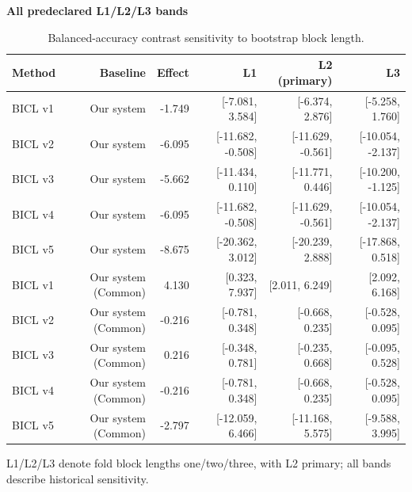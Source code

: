 \begin{table}[htb]
\centering\small
\setlength{\tabcolsep}{3pt}
\renewcommand{\arraystretch}{1.12}
\caption{Balanced-accuracy contrast sensitivity to bootstrap block length.}
\label{tab:u09-sensitivity-ba}
\textbf{All predeclared L1/L2/L3 bands}\par\smallskip
\begin{tabular}{lrrrrr}
\hline
Method & Baseline & Effect & L1 & L2 (primary) & L3 \\
\hline
BICL v1 & Our system & -1.749 & [-7.081, 3.584] & [-6.374, 2.876] & [-5.258, 1.760] \\
BICL v2 & Our system & -6.095 & [-11.682, -0.508] & [-11.629, -0.561] & [-10.054, -2.137] \\
BICL v3 & Our system & -5.662 & [-11.434, 0.110] & [-11.771, 0.446] & [-10.200, -1.125] \\
BICL v4 & Our system & -6.095 & [-11.682, -0.508] & [-11.629, -0.561] & [-10.054, -2.137] \\
BICL v5 & Our system & -8.675 & [-20.362, 3.012] & [-20.239, 2.888] & [-17.868, 0.518] \\
BICL v1 & Our system (Common) & 4.130 & [0.323, 7.937] & [2.011, 6.249] & [2.092, 6.168] \\
BICL v2 & Our system (Common) & -0.216 & [-0.781, 0.348] & [-0.668, 0.235] & [-0.528, 0.095] \\
BICL v3 & Our system (Common) & 0.216 & [-0.348, 0.781] & [-0.235, 0.668] & [-0.095, 0.528] \\
BICL v4 & Our system (Common) & -0.216 & [-0.781, 0.348] & [-0.668, 0.235] & [-0.528, 0.095] \\
BICL v5 & Our system (Common) & -2.797 & [-12.059, 6.466] & [-11.168, 5.575] & [-9.588, 3.995] \\
\hline
\end{tabular}\par\medskip
\begin{minipage}{\textwidth}\footnotesize L1/L2/L3 denote fold block lengths one/two/three, with L2 primary; all bands describe historical sensitivity.\end{minipage}
\end{table}
